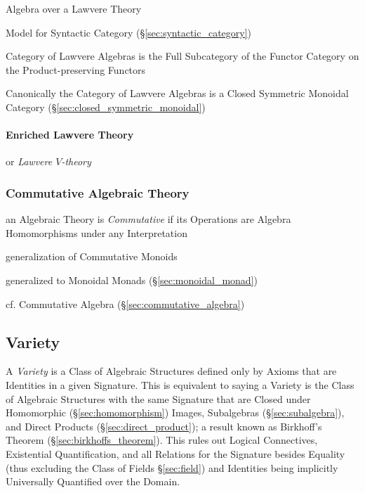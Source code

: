 Algebra over a Lawvere Theory

Model for Syntactic Category (\S\ref{sec:syntactic_category})

Category of Lawvere Algebras is the Full Subcategory of the Functor
Category on the Product-preserving Functors %

Canonically the Category of Lawvere Algebras is a Closed Symmetric
Monoidal Category (\S\ref{sec:closed_symmetric_monoidal})



\paragraph{Enriched Lawvere Theory}\label{sec:enriched_lawvere}\hfill
\cite{hyland-power06}

or \emph{Lawvere $V$-theory}



\subsubsection{Commutative Algebraic Theory}
\label{sec:commutative_algebraic_theory}

an Algebraic Theory is \emph{Commutative} if its Operations are Algebra
Homomorphisms under any Interpretation

generalization of Commutative Monoids

generalized to Monoidal Monads (\S\ref{sec:monoidal_monad})

\fist cf. Commutative Algebra (\S\ref{sec:commutative_algebra})



\subsection{Variety}\label{sec:variety}

A \emph{Variety} is a Class of Algebraic Structures defined only by
Axioms that are Identities in a given Signature. This is equivalent to
saying a Variety is the Class of Algebraic Structures with the same
Signature that are Closed under Homomorphic (\S\ref{sec:homomorphism})
Images, Subalgebras (\S\ref{sec:subalgebra}), and Direct Products
(\S\ref{sec:direct_product}); a result known as Birkhoff's Theorem
(\S\ref{sec:birkhoffs_theorem}). This rules out Logical Connectives,
Existential Quantification, and all Relations for the Signature
besides Equality (thus excluding the Class of Fields
\S\ref{sec:field}) and Identities being implicitly Universally
Quantified over the Domain.

